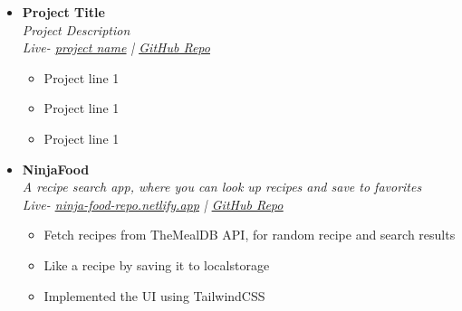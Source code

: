 \documentclass[11pt, oneside, a4paper, titlepage]{article}
\begin{document}
\begin{tcolorbox}
\begin{minipage}[t]{11cm}
\begin{tcolorbox}[grow to right by=0.75cm,colframe=white,colback=white]
\begin{itemize}
        \item
        {
          \textbf{Project Title} \\
          \textit{Project Description} \\
          \textit{Live- \href{url}{\underline{project name}} | \href{https://github.com/SazedWorldbringer}{\underline{GitHub Repo}}} \\
          \vspace*{-0.7cm}
          \begin{itemize}
            \item Project line 1
            \item Project line 1
            \item Project line 1
          \end{itemize}
        }

        \item
        {
          \textbf{NinjaFood} \\
          \textit{A recipe search app, where you can look up recipes and save to favorites} \\
          \textit{Live- \href{https://ninja-food-repo.netlify.app}{\underline{ninja-food-repo.netlify.app}} | \href{https://github.com/SazedWorldbringer/ninjafood}{\underline{GitHub Repo}}} \\
          \vspace*{-0.7cm}
          \begin{itemize}
            \item Fetch recipes from TheMealDB API, for random recipe and search results
            \item Like a recipe by saving it to localstorage
            \item Implemented the UI using TailwindCSS
          \end{itemize}
        }


\end{itemize}
\end{tcolorbox}
\end{minipage}
\end{tcolorbox}
\end{document}
